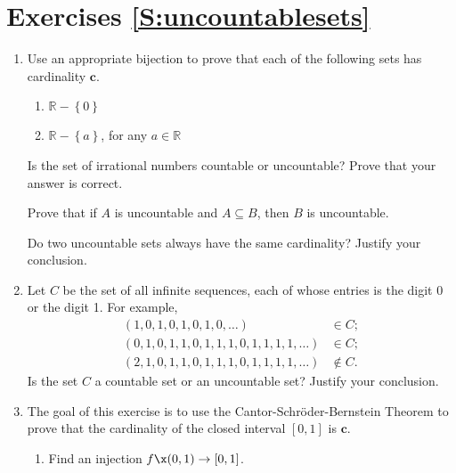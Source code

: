 \section*{Exercises \ref{S:uncountablesets}}

\begin{enumerate}
\item Use an appropriate bijection to prove that each of the following sets has cardinality $\boldsymbol{c}$. 
\label{exer:sec94-1}%
\begin{multicols}{2}
\begin{enumerate}
\yitem $( 0, \infty )$
\yitem $( a, \infty )$, for any $a \in \mathbb{R}$
\item $\mathbb{R} - \left\{ 0 \right\}$
\item $\mathbb{R} - \left\{ a \right\}$, for any $a \in \mathbb{R}$
\end{enumerate}
\end{multicols}

\xitem Is the set of irrational numbers countable or uncountable? Prove that your answer is correct. 
\label{exer:irrationaluncount}%

\xitem Prove that if $A$ is uncountable and $A \subseteq B$, then $B$ is uncountable.
\label{exer:supersetofuncount}%

\xitem Do two uncountable sets always have the same cardinality?  Justify your conclusion. \label{exer93:uncountablesets}


\item Let  $C$  be the set of all infinite sequences, each of whose entries is the digit 0 or the digit 1.  For example,
\[
\begin{aligned}
\left( 1, 0, 1, 0, 1, 0, 1, 0, \ldots \right) &\in C; \\
\left( 0, 1, 0, 1, 1, 0, 1, 1, 1, 0, 1, 1, 1, 1, \ldots \right) &\in C; \\
\left( 2, 1, 0, 1, 1, 0, 1, 1, 1, 0, 1, 1, 1, 1, \ldots \right) &\notin C.
\end{aligned}
\]
Is the set  $C$  a countable set or an uncountable set?  Justify your conclusion.


\item The goal of this exercise is to use the Cantor-Schr\"{o}der-Bernstein Theorem to prove that the cardinality of the closed interval $[ 0, 1 ]$ is $\boldsymbol{c}$.
\label{exer:closedinterval}%

\begin{enumerate}
\item Find an injection $f\x  ( 0, 1 ) \to [ 0, 1 ]$.


\end{enumerate}
\end{enumerate}
